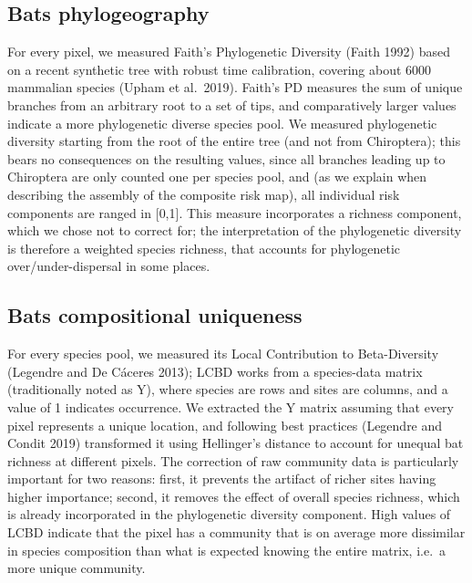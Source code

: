 \documentclass[10pt,oneside]{article}
\begin{document}
\hypertarget{bats-phylogeography}{%
\subsection{Bats phylogeography}\label{bats-phylogeography}}

For every pixel, we measured Faith's Phylogenetic Diversity (Faith 1992)
based on a recent synthetic tree with robust time calibration, covering
about 6000 mammalian species (Upham et al.~2019). Faith's PD measures
the sum of unique branches from an arbitrary root to a set of tips, and
comparatively larger values indicate a more phylogenetic diverse species
pool. We measured phylogenetic diversity starting from the root of the
entire tree (and not from Chiroptera); this bears no consequences on the
resulting values, since all branches leading up to Chiroptera are only
counted one per species pool, and (as we explain when describing the
assembly of the composite risk map), all individual risk components are
ranged in {[}0,1{]}. This measure incorporates a richness component,
which we chose not to correct for; the interpretation of the
phylogenetic diversity is therefore a weighted species richness, that
accounts for phylogenetic over/under-dispersal in some places.

\hypertarget{bats-compositional-uniqueness}{%
\subsection{Bats compositional
uniqueness}\label{bats-compositional-uniqueness}}

For every species pool, we measured its Local Contribution to
Beta-Diversity (Legendre and De Cáceres 2013); LCBD works from a
species-data matrix (traditionally noted as Y), where species are rows
and sites are columns, and a value of 1 indicates occurrence. We
extracted the Y matrix assuming that every pixel represents a unique
location, and following best practices (Legendre and Condit 2019)
transformed it using Hellinger's distance to account for unequal bat
richness at different pixels. The correction of raw community data is
particularly important for two reasons: first, it prevents the artifact
of richer sites having higher importance; second, it removes the effect
of overall species richness, which is already incorporated in the
phylogenetic diversity component. High values of LCBD indicate that the
pixel has a community that is on average more dissimilar in species
composition than what is expected knowing the entire matrix, i.e.~a more
unique community.
\end{document}

